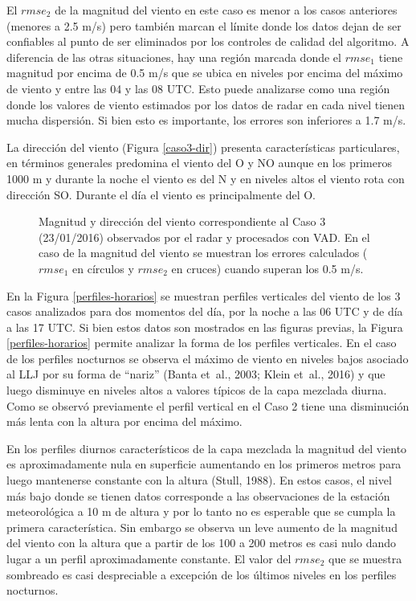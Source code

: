 \documentclass[12pt,spanish,oneside, a4paper]{book}
\begin{document}
El \(rmse_2\) de la magnitud del viento en este caso es menor a los
casos anteriores (menores a 2.5 m/s) pero también marcan el límite donde
los datos dejan de ser confiables al punto de ser eliminados por los
controles de calidad del algoritmo. A diferencia de las otras
situaciones, hay una región marcada donde el \(rmse_1\) tiene magnitud
por encima de 0.5 m/s que se ubica en niveles por encima del máximo de
viento y entre las 04 y las 08 UTC. Esto puede analizarse como una
región donde los valores de viento estimados por los datos de radar en
cada nivel tienen mucha dispersión. Si bien esto es importante, los
errores son inferiores a 1.7 m/s.

La dirección del viento (Figura \ref{caso3-dir}) presenta
características particulares, en términos generales predomina el viento
del O y NO aunque en los primeros 1000 m y durante la noche el viento es
del N y en niveles altos el viento rota con dirección SO. Durante el día
el viento es principalmente del O.

\begin{figure}
\newline{}\caption{Magnitud y dirección del viento  correspondiente al Caso 3 (23/01/2016) observados por el radar y procesados con VAD. En el caso de la magnitud del viento se muestran los errores calculados ($rmse_1$ en círculos y $rmse_2$ en cruces) cuando superan los 0.5 m/s. \label{campo-caso3}}\label{fig:campo-caso3}
\end{figure}

En la Figura \ref{perfiles-horarios} se muestran perfiles verticales del
viento de los 3 casos analizados para dos momentos del día, por la noche
a las 06 UTC y de día a las 17 UTC. Si bien estos datos son mostrados en
las figuras previas, la Figura \ref{perfiles-horarios} permite analizar
la forma de los perfiles verticales. En el caso de los perfiles
nocturnos se observa el máximo de viento en niveles bajos asociado al
LLJ por su forma de ``nariz'' (Banta et~al., 2003; Klein et~al., 2016) y
que luego disminuye en niveles altos a valores típicos de la capa
mezclada diurna. Como se observó previamente el perfil vertical en el
Caso 2 tiene una disminución más lenta con la altura por encima del
máximo.

En los perfiles diurnos característicos de la capa mezclada la magnitud
del viento es aproximadamente nula en superficie aumentando en los
primeros metros para luego mantenerse constante con la altura (Stull,
1988). En estos casos, el nivel más bajo donde se tienen datos
corresponde a las observaciones de la estación meteorológica a 10 m de
altura y por lo tanto no es esperable que se cumpla la primera
característica. Sin embargo se observa un leve aumento de la magnitud
del viento con la altura que a partir de los 100 a 200 metros es casi
nulo dando lugar a un perfil aproximadamente constante. El valor del
\(rmse_2\) que se muestra sombreado es casi despreciable a excepción de
los últimos niveles en los perfiles nocturnos.
\end{document}
